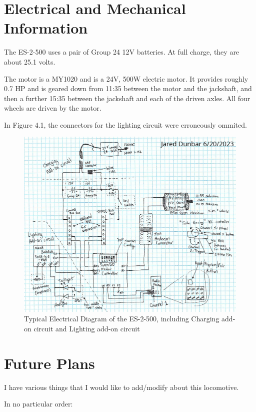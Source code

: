 \documentclass{book}
\begin{document}
\chapter{Electrical and Mechanical Information}

The ES-2-500 uses a pair of Group 24 12V batteries. At full charge, they are about 25.1 volts.

\par\vspace{3mm}
The motor is a MY1020 and is a 24V, 500W electric motor. It provides roughly 0.7 HP and is geared down from 11:35 between the motor and the jackshaft, and then a further 15:35 between the jackshaft and each of the driven axles. All four wheels are driven by the motor.

\par\vspace{3mm}
In Figure 4.1, the connectors for the lighting circuit were erroneously ommited.

\begin{figure}[h]
    \centering
    \includegraphics[width=1\textwidth]{schematic.jpg}
    \caption{Typical Electrical Diagram of the ES-2-500, including Charging add-on circuit and Lighting add-on circuit}
\end{figure}


\chapter {Future Plans}

I have various things that I would like to add/modify about this locomotive.
\par\vspace{3mm}
In no particular order:
\end{document}
